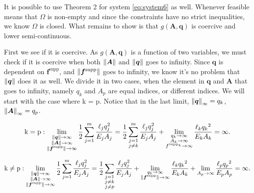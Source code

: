 It is possible to use Theorem 2 \cite{optThe} for system \eqref{eq:system6} as well. Whenever feasible means that $\Omega$ is non-empty and since the constraints have no strict inequalities, we know $\Omega$ is closed. What remains to show is that $g(\bm{A},\bm{q})$ is coercive and lower semi-continuous. 

First we see if it is coercive. As $g(\bm{A},\bm{q})$ is a function of two variables, we must check if it is coercive when both $\left\|\bm{A}\right\|$ and $\left\|\bm{q}\right\|$ goes to infinity. Since $\bm{q}$ is dependent on $\bm{f}^{\textrm{supp}}$, and $\left\|\bm{f}^{\textrm{supp}}\right\|$ goes to infinity, we know it's no problem that $\left\|\bm{q}\right\|$ does it as well.  We divide it in two cases, when the element in $\bm{q}$ and $\bm{A}$ that goes to infinity, namely $q_{k}$ and $A_{p}$ are equal indices, or different indices. We will start with the case where k = p. Notice that in the last limit, $\left\|\bm{q}\right\|_\infty = q_{k}$, $\left\|\bm{A}\right\|_\infty = q_{p}$.

\begin{equation}
\begin{aligned}
\textrm{k} = \textrm{p}:
\lim_{\substack{\left\|\bm{q}\right\|\to\infty \\ \left\|\bm{A}\right\|\to\infty \\ \left\|\bm{f}^ {\textrm{supp}}\right\|\to\infty}} \frac{1}{2}\sum_{j=1}^{m}\frac{\ell_{j}q_{j}^{2}}{E_{j}A_{j}} =  \frac{1}{2}\sum_{\substack{j=1 \\ j \neq k}}^{m}\frac{\ell_{j}q_{j}^{2}}{E_{j}A_{j}} + 
\lim_{\substack{{q}_{k}\to\infty \\ {A}_{k}\to\infty \\ f^{\textrm{supp}_{k}}\to\infty}}  \frac{\ell_{k}{q_{k}}^{2}}{E_{k} A_{k}} = \infty.
\end{aligned}
\end{equation}

\begin{equation}
\begin{aligned}
\textrm{k} \neq \textrm{p}:
\lim_{\substack{\left\|\bm{q}\right\|\to\infty \\ \left\|\bm{A}\right\|\to\infty \\ \left\|\bm{f}^ {\textrm{supp}}\right\|\to\infty}} \frac{1}{2}\sum_{j=1}^{m}\frac{\ell_{j}q_{j}^{2}}{E_{j}A_{j}} =  \frac{1}{2}\sum_{\substack{j=1 \\ j \neq k \\ j \neq p}}\frac{\ell_{j}q_{j}^{2}}{E_{j}A_{j}} + 
\lim_{\substack{{q}_{k}\to\infty \\ \left\|\bm{f}^{\textrm{supp}}\right\|\to\infty}}  \frac{\ell_{k}{q_{k}}^{2}}{E_{k} A_{k}}  + \lim_{{A}_{p}\to\infty}  \frac{\ell_{p}{q_{p}}^{2}}{E_{p} A_{p}} = \infty.
\end{aligned}
\end{equation}

